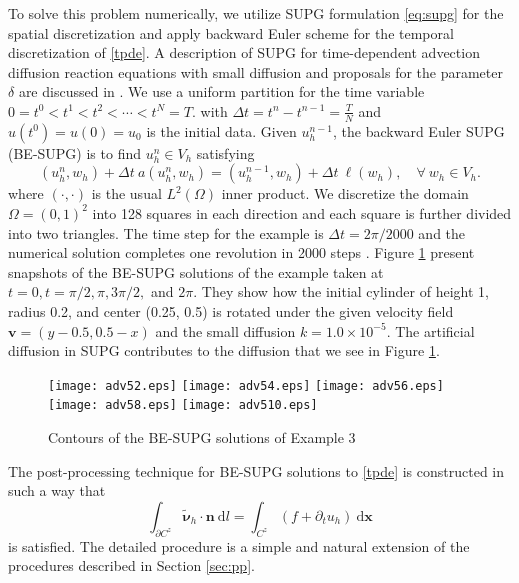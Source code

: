 \documentclass[times]{nlaauth}
\numberwithin{equation}{section}
\begin{document}
To solve this problem numerically, we utilize SUPG formulation \eqref{eq:supg} for the spatial discretization  and apply backward Euler scheme for the temporal discretization of \eqref{tpde}. A description of SUPG for time-dependent advection diffusion reaction equations with small diffusion and proposals for the parameter $\delta$ are discussed in \cite{john2008finite}. We use a uniform partition for the time variable $0 = t^0 < t^1 < t^2 < \cdots < t^N = T.$ with $\Delta t = t^n - t^{n-1} = \frac{T}{N}$ and $u(t^0) = u(0) = u_0$ is the initial data. Given $u^{n-1}_h$, the backward Euler SUPG (BE-SUPG) is to  find $u^n_h \in V_h$ satisfying
\begin{equation} \label{eq:tsfem}
(u^n_h, w_h) + \Delta t ~a(u^n_h, w_h) = (u^{n-1}_h, w_h) + \Delta t ~\ell(w_h), \quad \forall \ w_h \in V_h.
\end{equation}
where $(\cdot, \cdot)$ is the usual $L^2(\Omega)$ inner product.
We discretize the domain $\Omega = (0, 1)^2$ into 128 squares in each direction
and each square is further divided into two triangles. The time step for the example is $\Delta t = 2\pi / 2000$ and the numerical solution completes one revolution in 2000 steps \cite{bochev2013new}. Figure \ref{fig:timed2} present snapshots of the BE-SUPG solutions of the example taken at $t=0, t=\pi/2, \pi, 3\pi/2,$ and $2\pi.$ They show how the initial cylinder of height 1, radius 0.2, and center (0.25, 0.5) is rotated under the given velocity field $\boldsymbol{v} = (y-0.5, 0.5-x)$ and the small diffusion $k = 1.0\times 10^{-5}.$ The artificial diffusion in SUPG contributes to the diffusion that we see in Figure \ref{fig:timed2}.

\begin{figure}
\centering
\texttt{[image: adv52.eps]} 
\texttt{[image: adv54.eps]} 
\texttt{[image: adv56.eps]} 
\texttt{[image: adv58.eps]} 
\texttt{[image: adv510.eps]} 
\caption{Contours of the BE-SUPG solutions of Example 3}
\label{fig:timed2}
\end{figure}

\noindent
The post-processing technique for BE-SUPG solutions to \eqref{tpde} is constructed in such a way that 
\begin{equation} \label{eq:tcvconservation}
\int_{\partial C^z} \widetilde {\boldsymbol{\nu}}_h \cdot \boldsymbol{n}  \ \text{d} l = \int_{C^z} ( f + \partial_t u_h ) \ \text{d} \boldsymbol{x}
\end{equation}
is satisfied.
The detailed procedure is a simple and natural extension of the procedures described in Section \ref{sec:pp}.
\end{document}
